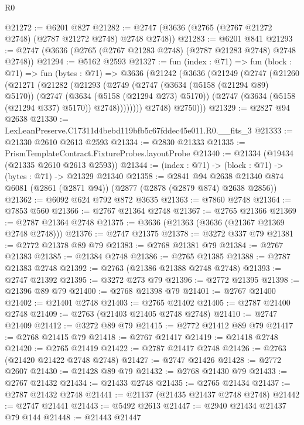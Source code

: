 \begin{lexlean}{R0}
\begin{coremodule}
@21272 := @6201 @827
@21282 := @2747 (@3636 (@2765 (@2767 @21272 @2748) (@2787 @21272 @2748) @2748 @2748))
@21283 := @6201 @841
@21293 := @2747 (@3636 (@2765 (@2767 @21283 @2748) (@2787 @21283 @2748) @2748 @2748))
@21294 := @5162 @2593
@21327 := fun (index : @71) =>
  fun (block : @71) =>
  fun (bytes : @71) =>
  @3636
    (@21242
      (@3636
        (@21249
          (@2747
            (@21260
              (@21271
                (@21282
                  (@21293
                    (@2749
                      (@2747
                        (@3634 (@5158 (@21294 @89) @5170))
                        (@2747
                          (@3634 (@5158 (@21294 @273) @5170))
                          (@2747 (@3634 (@5158 (@21294 @337) @5170)) @2748))))))))
            @2748)
          @2750)))
@21329 := @2827 @94 @2638
@21330 := LexLeanPreserve.C17311d4bebd119bfb5c67fddec45e011.R0.__fits_3
@21333 := @21330 @2610 @2613 @2593
@21334 := @2830 @21333
@21335 := PrismTemplateContract.FixtureProbes.layoutProbe
@21340 := @21334 (@19434 (@21335 @2610 @2613 @2593))
@21344 := (index : @71) -> (block : @71) -> (bytes : @71) -> @21329 @21340
@21358 := @2841
    @94
    @2638
    @21340
    @874
    @6081
    (@2861 (@2871 @94))
    (@2877 (@2878 (@2879 @874) @2638 @2856))
@21362 := @6092 @624 @792 @872 @3635
@21363 := @7860 @2748
@21364 := @7853 @560
@21366 := @2767 @21364 @2748
@21367 := @2765 @21366
@21369 := @2787 @21364 @2748
@21375 := @3636 (@21363 (@3636 (@21367 @21369 @2748 @2748)))
@21376 := @2747 @21375
@21378 := @3272 @337 @79
@21381 := @2772 @21378 @89 @79
@21383 := @2768 @21381 @79
@21384 := @2767 @21383
@21385 := @21384 @2748
@21386 := @2765 @21385
@21388 := @2787 @21383 @2748
@21392 := @2763 (@21386 @21388 @2748 @2748)
@21393 := @2747 @21392
@21395 := @3272 @273 @79
@21396 := @2772 @21395
@21398 := @21396 @89 @79
@21400 := @2768 @21398 @79
@21401 := @2767 @21400
@21402 := @21401 @2748
@21403 := @2765 @21402
@21405 := @2787 @21400 @2748
@21409 := @2763 (@21403 @21405 @2748 @2748)
@21410 := @2747 @21409
@21412 := @3272 @89 @79
@21415 := @2772 @21412 @89 @79
@21417 := @2768 @21415 @79
@21418 := @2767 @21417
@21419 := @21418 @2748
@21420 := @2765 @21419
@21422 := @2787 @21417 @2748
@21426 := @2763 (@21420 @21422 @2748 @2748)
@21427 := @2747 @21426
@21428 := @2772 @2607
@21430 := @21428 @89 @79
@21432 := @2768 @21430 @79
@21433 := @2767 @21432
@21434 := @21433 @2748
@21435 := @2765 @21434
@21437 := @2787 @21432 @2748
@21441 := @21137 (@21435 @21437 @2748 @2748)
@21442 := @2747 @21441
@21443 := @5492 @2613
@21447 := @2940 @21434 @21437 @79 @144
@21448 := @21443 @21447

\end{coremodule}
\end{lexlean}
